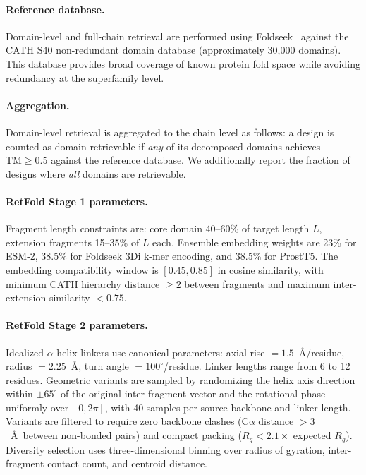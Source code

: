 \documentclass[letterpaper]{article} %
\begin{document}
\paragraph{Reference database.} Domain-level and full-chain retrieval are performed using Foldseek~\cite{vankempen2024foldseek} against the CATH S40 non-redundant domain database (approximately 30,000 domains). This database provides broad coverage of known protein fold space while avoiding redundancy at the superfamily level.

\paragraph{Aggregation.} Domain-level retrieval is aggregated to the chain level as follows: a design is counted as domain-retrievable if \emph{any} of its decomposed domains achieves $\mathrm{TM} \geq 0.5$ against the reference database. We additionally report the fraction of designs where \emph{all} domains are retrievable.

\paragraph{RetFold Stage 1 parameters.} Fragment length constraints are: core domain 40--60\% of target length $L$, extension fragments 15--35\% of $L$ each. Ensemble embedding weights are 23\% for ESM-2, 38.5\% for Foldseek 3Di k-mer encoding, and 38.5\% for ProstT5. The embedding compatibility window is $[0.45, 0.85]$ in cosine similarity, with minimum CATH hierarchy distance $\geq 2$ between fragments and maximum inter-extension similarity $< 0.75$.

\paragraph{RetFold Stage 2 parameters.} Idealized $\alpha$-helix linkers use canonical parameters: axial rise $= 1.5$~\AA/residue, radius $= 2.25$~\AA, turn angle $= 100^\circ$/residue. Linker lengths range from 6 to 12 residues. Geometric variants are sampled by randomizing the helix axis direction within $\pm 65^\circ$ of the original inter-fragment vector and the rotational phase uniformly over $[0, 2\pi]$, with 40 samples per source backbone and linker length. Variants are filtered to require zero backbone clashes ($\mathrm{C\alpha}$ distance $> 3$~\AA\ between non-bonded pairs) and compact packing ($R_g < 2.1 \times$ expected $R_g$). Diversity selection uses three-dimensional binning over radius of gyration, inter-fragment contact count, and centroid distance.
\end{document}
